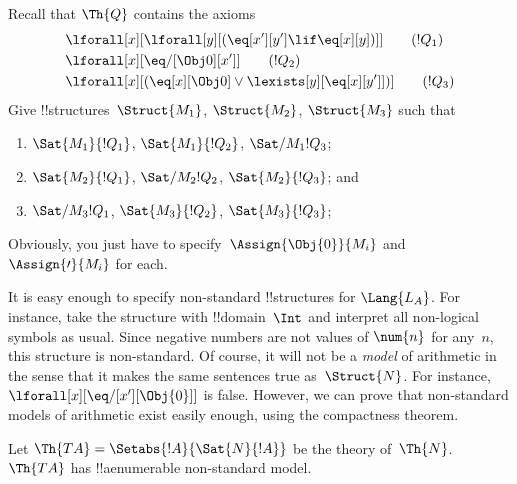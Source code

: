 \documentclass[../../../include/open-logic-section]{subfiles}
\begin{document}
\begin{prob}
Recall that $\Th{Q}$ contains the axioms
\begin{align*}
& \lforall[x][\lforall[y][(\eq[x'][y'] \lif \eq[x][y])]] \tag{$!Q_1$}\\
& \lforall[x][\eq/[\Obj 0][x']] \tag{$!Q_2$}\\
& \lforall[x][(\eq[x][\Obj 0] \lor \lexists[y][\eq[x][y']])] \tag{$!Q_3$}
\end{align*}
Give !!{structure}s~$\Struct{M_1}$, $\Struct{M_2}$, $\Struct{M_3}$ such that
\begin{enumerate}
\item $\Sat{M_1}{!Q_1}$, $\Sat{M_1}{!Q_2}$, $\Sat/{M_1}{!Q_3}$;
\item $\Sat{M_2}{!Q_1}$, $\Sat/{M_2}{!Q_2}$, $\Sat{M_2}{!Q_3}$; and
\item $\Sat/{M_3}{!Q_1}$, $\Sat{M_3}{!Q_2}$, $\Sat{M_3}{!Q_3}$;
\end{enumerate}
Obviously, you just have to specify~$\Assign{\Obj{0}}{M_i}$ and
$\Assign{\prime}{M_i}$ for each.
\end{prob}

\begin{explain}
It is easy enough to specify non-standard !!{structure}s for
$\Lang{L_A}$. For instance, take the structure with !!{domain}~$\Int$
and interpret all non-logical symbols as usual. Since negative numbers
are not values of $\num{n}$ for any~$n$, this structure is
non-standard. Of course, it will not be a \emph{model} of arithmetic
in the sense that it makes the same sentences true
as~$\Struct{N}$. For instance, $\lforall[x][\eq/[x'][\Obj{0}]]$ is
false.  However, we can prove that non-standard models of arithmetic
exist easily enough, using the compactness theorem.
\end{explain}

\begin{prop}
Let $\Th{TA} = \Setabs{!A}{\Sat{N}{!A}}$ be the theory
of~$\Th{N}$. $\Th{TA}$ has !!a{enumerable} non-standard model.
\end{prop}
\end{document}
